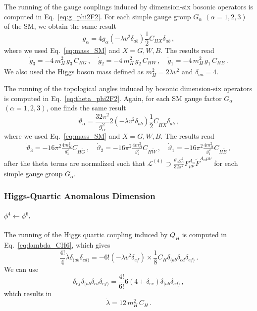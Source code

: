 The running of the gauge couplings induced by dimension-six bosonic operators is computed in Eq.~\eqref{eq:g_phi2F2}. For each simple gauge group $G_\alpha$ $(\alpha=1,2,3)$ of the SM, we obtain the same result  
\begin{equation}
    \dot{g}_\alpha = 4 g_\alpha \left(-\lambda v^2 \delta_{ab}\right) \frac{1}{2} C_{HX} \delta_{ab}\,,
\end{equation}
where we used Eq.~\eqref{eq:mass_SM} and $X=G,W,B$. The results read
\begin{align}
     \dot{g}_3 =  - 4\, m_H^2\, g_3\, C_{HG}\,,\quad  
     \dot{g}_2 =  - 4\, m_H^2\, g_2\, C_{HW}\,,\quad
     \dot{g}_1 =  - 4\, m_H^2\, g_1\, C_{HB}\,.
\end{align}
We also used the Higgs boson mass defined as $m_H^2=2\lambda v^2$ and $\delta_{aa}=4$.

The running of the topological angles induced by bosonic dimension-six operators is computed in Eq.~\eqref{eq:theta_phi2F2}. Again, for each SM gauge factor $G_\alpha$ $(\alpha=1,2,3)$, one finds the same result  
\begin{equation}
    \dot{\vartheta}_\alpha = \frac{32\pi^2}{g_\alpha^2} 2\left(-\lambda v^2 \delta_{ab}\right) \frac{1}{2} C_{H\widetilde{X}} \delta_{ab}\,,
\end{equation}
where we used Eq.~\eqref{eq:mass_SM} and $X=G,W,B$. The results read
\begin{align}
     \dot{\vartheta}_3 = -16\pi^2 \frac{4m_H^2}{g_3^2} C_{H\widetilde{G}}\,,\quad \dot{\vartheta}_2 = -16\pi^2  \frac{4m_H^2}{g_2^2} C_{H\widetilde{W}}\,,\quad \dot{\vartheta}_1 = -16\pi^2  \frac{4m_H^2}{g_1^2} C_{H\widetilde{B}}\,,
\end{align}
after the theta terms are normalized such that $\mathcal{L}^{(4)} \supset \frac{\vartheta_\alpha g_\alpha^2}{32\pi^2} F_{\mu\nu}^{A_\alpha} \widetilde{F}^{A_\alpha\mu\nu}$ for each simple gauge group $G_\alpha$.

\subsubsection{Higgs-Quartic Anomalous Dimension}
\paragraph{\texorpdfstring{$\phi^4\leftarrow \phi^6$}{phi4fromphi6}.} The running of the Higgs quartic coupling induced by $Q_{H}$ is computed in Eq.~\eqref{eq:lambda_CH6}, which gives
\begin{equation}
    \frac{4!}{4}\dot{\lambda}\delta_{(ab}\delta_{cd)} = - 6! \left(-\lambda v^2 \delta_{ef}\right) \times \frac{1}{8} C_{H} \delta_{(ab}\delta_{cd}\delta_{ef)}\,.
\end{equation}
We can use 
\begin{equation}
    \delta_{ef} \delta_{(ab}\delta_{cd}\delta_{ef)} = \frac{4!}{6!} 6(4+\delta_{ee})\delta_{(ab}\delta_{cd)}\,,
\end{equation}
which results in
\begin{equation}
    \dot{\lambda} = 12\, m_H^2\, C_H\,.
\end{equation}

